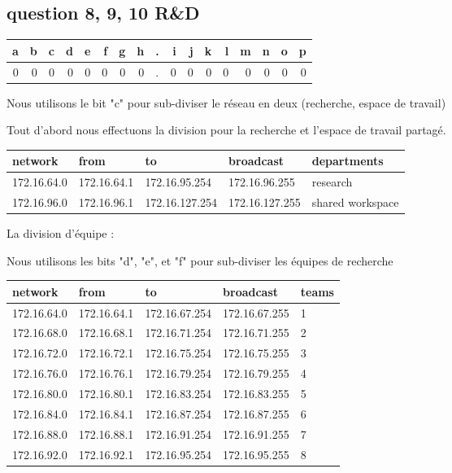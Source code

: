 \documentclass[11pt]{article}
\begin{document}
\subsection{question  8, 9, 10 R\&D}
\label{sec:orgheadline14}


\begin{center}
\begin{tabular}{rrrrrrrrlrrrrrrrr}
a & b & c & d & e & f & g & h & . & i & j & k & l & m & n & o & p\\
\hline
0 & 0 & 0 & 0 & 0 & 0 & 0 & 0 & . & 0 & 0 & 0 & 0 & 0 & 0 & 0 & 0\\
\end{tabular}
\end{center}

Nous utilisons le bit "c" pour sub-diviser le réseau en deux (recherche,
espace de travail)


Tout d'abord nous effectuons la division pour la recherche et l'espace de travail
partagé.
\begin{center}
\begin{tabular}{|l|l|l|l|l|}
\hline
network & from & to & broadcast & departments \\
\hline
172.16.64.0 & 172.16.64.1 & 172.16.95.254 & 172.16.96.255 & research \\
\hline
172.16.96.0 & 172.16.96.1 & 172.16.127.254 & 172.16.127.255 & shared workspace \\
\hline
\end{tabular}
\end{center}

La division d'équipe :


Nous utilisons les bits "d", "e", et "f" pour sub-diviser
les équipes de recherche


\begin{center}
\begin{tabular}{|l|l|l|l|l|}
\hline
network & from & to & broadcast & teams \\
\hline
172.16.64.0 & 172.16.64.1 & 172.16.67.254 & 172.16.67.255 & 1 \\
\hline
172.16.68.0 & 172.16.68.1 & 172.16.71.254 & 172.16.71.255 & 2 \\
\hline
172.16.72.0 & 172.16.72.1 & 172.16.75.254 & 172.16.75.255 & 3 \\
\hline
172.16.76.0 & 172.16.76.1 & 172.16.79.254 & 172.16.79.255 & 4 \\
\hline
172.16.80.0 & 172.16.80.1 & 172.16.83.254 & 172.16.83.255 & 5 \\
\hline
172.16.84.0 & 172.16.84.1 & 172.16.87.254 & 172.16.87.255 & 6 \\
\hline
172.16.88.0 & 172.16.88.1 & 172.16.91.254 & 172.16.91.255 & 7 \\
\hline
172.16.92.0 & 172.16.92.1 & 172.16.95.254 & 172.16.95.255 & 8 \\
\hline
\end{tabular}
\end{center}
\end{document}
